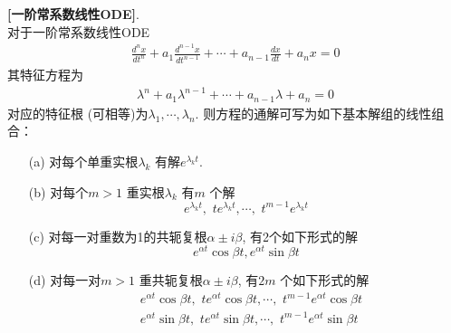 	\begin{thm}\label{thm B.5.1}
		\textbf{[一阶常系数线性ODE]}. \\
		对于一阶常系数线性ODE
		\begin{align*}
			\frac{d^n x}{dt^n} + a_1 \frac{d^{n - 1} x}{d t^{n - 1}} + \cdots + a_{n - 1} \frac{dx}{dt} + a_n x = 0
		\end{align*}
		其特征方程为
		\begin{align*}
			\lambda^n + a_1 \lambda^{n - 1} + \cdots + a_{n - 1} \lambda + a_n = 0
		\end{align*}
		对应的特征根 (可相等)为$\lambda_1 , \cdots , \lambda_n$. 则方程的通解可写为如下基本解组的线性组合：
		
		\vspace*{1em}
		
		\begin{enumerate}
			\item[(a)] 对每个单重实根$\lambda_k$ 有解$e^{\lambda_k t}$. 
			
			\vspace*{1em}
			
			\item[(b)] 对每个$m > 1$ 重实根$\lambda_k$ 有$m$ 个解
			\[ e^{\lambda_k t} , \,\, te^{\lambda_k t} , \cdots , \,\, t^{m - 1} e^{\lambda_k t} \]
			
			\vspace*{1em}
			
			\item[(c)] 对每一对重数为1的共轭复根$\alpha \pm i \beta$, 有2个如下形式的解
			\[ e^{\alpha t} \cos \beta t , e^{\alpha t} \sin \beta t \]
			
			\vspace*{1em}
			
			\item[(d)] 对每一对$m > 1$ 重共轭复根$\alpha \pm i \beta$, 有$2m$ 个如下形式的解
			\begin{align*}
				&e^{\alpha t} \cos \beta t , \,\, t e^{\alpha t} \cos \beta t , \cdots , \,\, t^{m - 1} e^{\alpha t} \cos \beta t \\
				&e^{\alpha t} \sin \beta t , \,\, t e^{\alpha t} \sin \beta t , \cdots , \,\, t^{m - 1} e^{\alpha t} \sin \beta t
			\end{align*}
		\end{enumerate}
	\end{thm}






	\ifx\allfiles\undefined

\fi